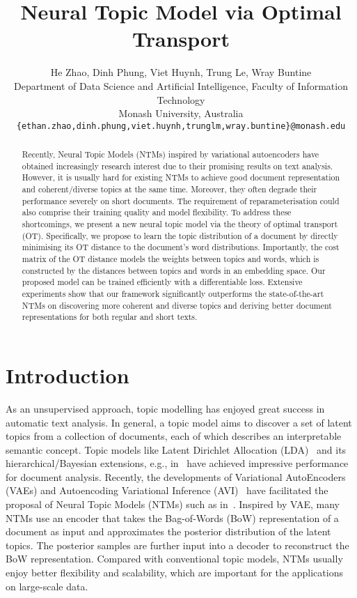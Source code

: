 \documentclass{article}
\title{Neural Topic Model via Optimal Transport}
\author{He Zhao, Dinh Phung, Viet Huynh, Trung Le, Wray Buntine
\\
Department of Data Science and Artificial Intelligence, 
Faculty of Information Technology\\
Monash University, Australia\\
\texttt{\{ethan.zhao,dinh.phung,viet.huynh,trunglm,wray.buntine\}@monash.edu} \\
}
\begin{document}
\maketitle

\begin{abstract}
Recently, Neural Topic Models (NTMs) inspired by variational autoencoders have obtained increasingly research interest due to their promising results on text analysis. However, it is usually hard for existing NTMs to achieve good document representation and coherent/diverse topics at the same time. Moreover, they often degrade their performance severely on short documents. The requirement of reparameterisation could also comprise their training quality and model flexibility.
To address these shortcomings, we present a new neural topic model via the theory of optimal transport (OT). Specifically, we propose to learn the topic distribution of a document by directly minimising its OT distance to the document's word distributions. Importantly, the cost matrix of the OT distance models the weights between topics and words, which is constructed by the distances between topics and words in an embedding space. Our proposed model can be trained efficiently with a differentiable loss.
Extensive experiments show that our framework significantly outperforms the state-of-the-art NTMs on discovering more coherent and diverse topics and deriving better document representations for both regular and short texts.
\end{abstract}

\section{Introduction}
As an unsupervised approach, topic modelling has enjoyed great success in   automatic text analysis.
In general, a topic model aims to discover a set of latent topics from a collection of documents, each of which describes an interpretable semantic concept.
Topic models like Latent Dirichlet Allocation (LDA)~\citep{blei2003latent} and its hierarchical/Bayesian extensions, e.g., in~\citet{blei2010nested,paisley2015nested,gan2015learning,zhou2016augmentable} have achieved impressive performance for document analysis.
Recently, the developments of Variational AutoEncoders (VAEs) and Autoencoding Variational Inference (AVI)~\citep{kingma2013auto,rezende2014stochastic}
have facilitated the proposal of Neural Topic Models (NTMs) such as in~\citet{miao2016neural,srivastava2017autoencoding,krishnan2018challenges,burkhardt2019decoupling}.
Inspired by VAE, many NTMs use an encoder that takes the Bag-of-Words (BoW) representation of a document as input and approximates the posterior distribution of the latent topics. The posterior samples are further input into a decoder to reconstruct the BoW representation.
Compared with conventional topic models, NTMs usually enjoy better flexibility and scalability, which are important for the applications on large-scale data.
\end{document}
